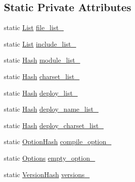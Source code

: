 \subsection*{Static Private Attributes}
\begin{DoxyCompactItemize}
\item 
static \hyperlink{classmocha_1_1_x_m_l_setting_info_aaf66398a517745d0580193a8f89624f2}{List} \hyperlink{classmocha_1_1_x_m_l_setting_info_a984a9bbf22a3637e0acc8fa884d3979f}{file\_\-list\_\-}
\item 
static \hyperlink{classmocha_1_1_x_m_l_setting_info_aaf66398a517745d0580193a8f89624f2}{List} \hyperlink{classmocha_1_1_x_m_l_setting_info_a919c4593d551bf388e8f7b689c68e2a5}{include\_\-list\_\-}
\item 
static \hyperlink{classmocha_1_1_x_m_l_setting_info_a2954735e05daa0b58bebbe20124aeb94}{Hash} \hyperlink{classmocha_1_1_x_m_l_setting_info_aa68364a3a6a738558b532e3de61df93d}{module\_\-list\_\-}
\item 
static \hyperlink{classmocha_1_1_x_m_l_setting_info_a2954735e05daa0b58bebbe20124aeb94}{Hash} \hyperlink{classmocha_1_1_x_m_l_setting_info_a5ec79a158bbd05223b47a65a360f9677}{charset\_\-list\_\-}
\item 
static \hyperlink{classmocha_1_1_x_m_l_setting_info_a2954735e05daa0b58bebbe20124aeb94}{Hash} \hyperlink{classmocha_1_1_x_m_l_setting_info_aed09d69d81c7d7f897cd7c46846f1513}{deploy\_\-list\_\-}
\item 
static \hyperlink{classmocha_1_1_x_m_l_setting_info_a2954735e05daa0b58bebbe20124aeb94}{Hash} \hyperlink{classmocha_1_1_x_m_l_setting_info_a4e0e690ae9e8fa08b262e0412a5e6185}{deploy\_\-name\_\-list\_\-}
\item 
static \hyperlink{classmocha_1_1_x_m_l_setting_info_a2954735e05daa0b58bebbe20124aeb94}{Hash} \hyperlink{classmocha_1_1_x_m_l_setting_info_ae6cf2379ceb2ff0e305cf591ce53f398}{deploy\_\-charset\_\-list\_\-}
\item 
static \hyperlink{classmocha_1_1_x_m_l_setting_info_a8346f24b51b8fe9ada57eab1731be3e5}{OptionHash} \hyperlink{classmocha_1_1_x_m_l_setting_info_a3adc9b8aedbdf5a80a54b5737d7b4cf9}{compile\_\-option\_\-}
\item 
static \hyperlink{classmocha_1_1_options}{Options} \hyperlink{classmocha_1_1_x_m_l_setting_info_aeb01f25660d607e290dbc03402072e2b}{empty\_\-option\_\-}
\item 
static \hyperlink{classmocha_1_1_x_m_l_setting_info_a7166e12491f90d077bf46befe42e5f31}{VersionHash} \hyperlink{classmocha_1_1_x_m_l_setting_info_ae097a8846946f392c4baf6674346773a}{versions\_\-}
\end{DoxyCompactItemize}
